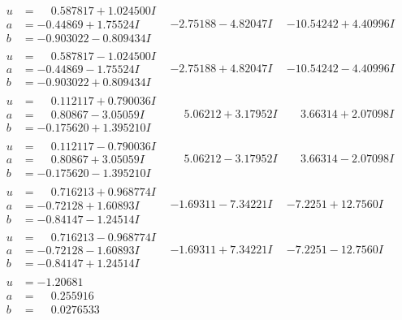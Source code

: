 \documentclass[1p]{elsarticle_modified}
\theoremstyle{definition}
\begin{document}
$$\begin{array}{c|c|c}
\begin{aligned}
u &= \phantom{-}0.587817 + 1.024500 I \\
a &= -0.44869 + 1.75524 I \\
b &= -0.903022 - 0.809434 I\end{aligned}
 & -2.75188 - 4.82047 I & -10.54242 + 4.40996 I \\ \hline\begin{aligned}
u &= \phantom{-}0.587817 - 1.024500 I \\
a &= -0.44869 - 1.75524 I \\
b &= -0.903022 + 0.809434 I\end{aligned}
 & -2.75188 + 4.82047 I & -10.54242 - 4.40996 I \\ \hline\begin{aligned}
u &= \phantom{-}0.112117 + 0.790036 I \\
a &= \phantom{-}0.80867 - 3.05059 I \\
b &= -0.175620 + 1.395210 I\end{aligned}
 & \phantom{-}5.06212 + 3.17952 I & \phantom{-}3.66314 + 2.07098 I \\ \hline\begin{aligned}
u &= \phantom{-}0.112117 - 0.790036 I \\
a &= \phantom{-}0.80867 + 3.05059 I \\
b &= -0.175620 - 1.395210 I\end{aligned}
 & \phantom{-}5.06212 - 3.17952 I & \phantom{-}3.66314 - 2.07098 I \\ \hline\begin{aligned}
u &= \phantom{-}0.716213 + 0.968774 I \\
a &= -0.72128 + 1.60893 I \\
b &= -0.84147 - 1.24514 I\end{aligned}
 & -1.69311 - 7.34221 I & -7.2251 + 12.7560 I \\ \hline\begin{aligned}
u &= \phantom{-}0.716213 - 0.968774 I \\
a &= -0.72128 - 1.60893 I \\
b &= -0.84147 + 1.24514 I\end{aligned}
 & -1.69311 + 7.34221 I & -7.2251 - 12.7560 I \\ \hline\begin{aligned}
u &= -1.20681\phantom{ +0.000000I} \\
a &= \phantom{-}0.255916\phantom{ +0.000000I} \\
b &= \phantom{-}0.0276533\phantom{ +0.000000I}\end{aligned}

\end{array}$$
\end{document}
